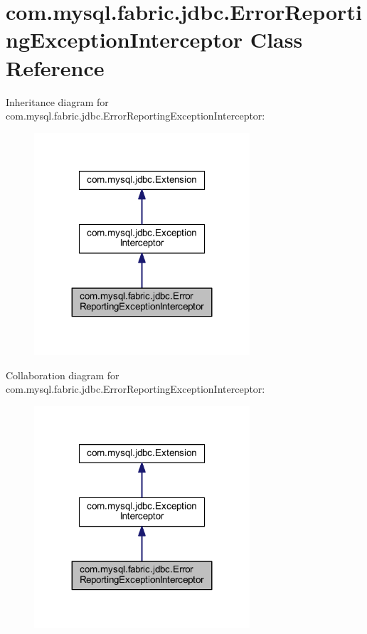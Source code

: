 \hypertarget{classcom_1_1mysql_1_1fabric_1_1jdbc_1_1_error_reporting_exception_interceptor}{}\section{com.\+mysql.\+fabric.\+jdbc.\+Error\+Reporting\+Exception\+Interceptor Class Reference}
\label{classcom_1_1mysql_1_1fabric_1_1jdbc_1_1_error_reporting_exception_interceptor}


Inheritance diagram for com.\+mysql.\+fabric.\+jdbc.\+Error\+Reporting\+Exception\+Interceptor\+:\nopagebreak
\begin{figure}[H]
\begin{center}
\leavevmode
\includegraphics[width=227pt]{classcom_1_1mysql_1_1fabric_1_1jdbc_1_1_error_reporting_exception_interceptor__inherit__graph}
\end{center}
\end{figure}


Collaboration diagram for com.\+mysql.\+fabric.\+jdbc.\+Error\+Reporting\+Exception\+Interceptor\+:\nopagebreak
\begin{figure}[H]
\begin{center}
\leavevmode
\includegraphics[width=227pt]{classcom_1_1mysql_1_1fabric_1_1jdbc_1_1_error_reporting_exception_interceptor__coll__graph}
\end{center}
\end{figure}
